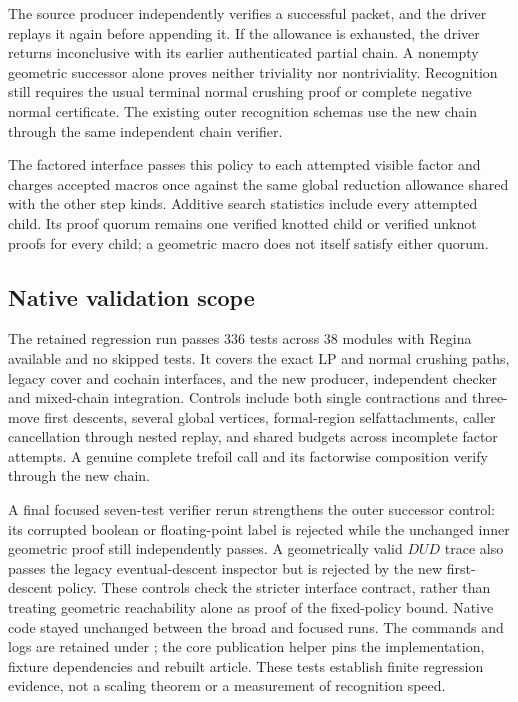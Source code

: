 The source producer independently verifies a successful packet, and
the driver replays it again before appending it.  If the allowance is
exhausted, the driver returns inconclusive with its earlier authenticated
partial chain.  A nonempty geometric successor alone proves neither
triviality nor nontriviality.  Recognition still requires the usual
terminal normal crushing proof or complete negative normal certificate.
The existing outer recognition schemas use the new chain through the
same independent chain verifier.

The factored interface passes this policy to each attempted visible
factor and charges accepted macros once against the same global
reduction allowance shared with the other step kinds.  Additive search
statistics include every attempted child.  Its proof quorum remains
one verified knotted child or verified unknot proofs for every child;
a geometric macro does not itself satisfy either quorum.

\subsection{Native validation scope}

The retained regression run passes $336$ tests across $38$ modules with
Regina available and no skipped tests.  It covers the exact LP and normal
crushing paths, legacy cover and cochain interfaces, and the new producer,
independent checker and mixed-chain integration.  Controls include both
single contractions and three-move first descents, several global vertices,
formal-region selfattachments, caller cancellation through nested replay,
and shared budgets across incomplete factor attempts.  A genuine complete
trefoil call and its factorwise composition verify through the new chain.

A final focused seven-test verifier rerun strengthens the outer successor
control: its corrupted boolean or floating-point label is rejected while
the unchanged inner geometric proof still independently passes.  A
geometrically valid $DUD$ trace also passes the legacy eventual-descent
inspector but is rejected by the new first-descent policy.  These controls
check the stricter interface contract, rather than treating geometric
reachability alone as proof of the fixed-policy bound.  Native code stayed
unchanged between the broad and focused runs.  The commands and logs are
retained under ; the core publication helper
pins the implementation, fixture dependencies and rebuilt article.
These tests establish finite regression evidence, not a scaling theorem
or a measurement of recognition speed.


